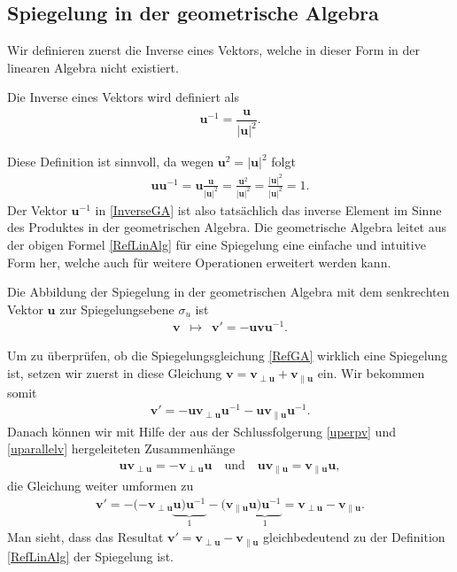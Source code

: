 \subsection{Spiegelung in der geometrische Algebra}
Wir definieren zuerst die Inverse eines Vektors, welche in dieser Form in der linearen Algebra nicht existiert.
%
\begin{definition}
	Die Inverse eines Vektors wird definiert als
	\begin{align} \label{InverseGA}
	\mathbf{u}^{-1} = \dfrac{\mathbf{u}}{|\mathbf{u}|^2}. 
	\end{align}
\end{definition}
Diese Definition ist sinnvoll, da wegen $\mathbf{u}^2 = |\mathbf{u}|^2$ folgt
\begin{align*}
\mathbf{uu}^{-1} = \mathbf{u} \frac{\mathbf{u}}{|\mathbf{u}|^2} = \frac{\mathbf{u}^2}{|\mathbf{u}|^2} = \frac{|\mathbf{u}|^2}{|\mathbf{u}|^2} = 1.
\end{align*}
Der Vektor $\mathbf{u}^{-1}$ in \eqref{InverseGA} ist also tatsächlich das inverse Element im Sinne des Produktes in der geometrischen Algebra.
Die geometrische Algebra leitet aus der obigen Formel \eqref{RefLinAlg} für eine Spiegelung eine einfache und intuitive Form her, welche auch für weitere Operationen erweitert werden kann.
\begin{definition}
	Die Abbildung der Spiegelung in der geometrischen Algebra mit dem senkrechten Vektor $\mathbf{u}$ zur Spiegelungsebene $\sigma_u$ ist 
	\begin{align}\label{RefGA}
	\mathbf{v} \enspace\mapsto\enspace \mathbf{v}' = -\mathbf{uvu}^{-1}.
	\end{align}
\end{definition}
Um zu überprüfen, ob die Spiegelungsgleichung \eqref{RefGA} wirklich eine Spiegelung ist, setzen wir zuerst in diese Gleichung $\mathbf{v} = \mathbf{v_{\perp u}} + \mathbf{v_{\parallel u}}$ ein. Wir bekommen somit
\begin{align*}
\mathbf{v}' = -\mathbf{uv_{\perp u}u}^{-1} - \mathbf{uv_{\parallel u}u}^{-1}.
\end{align*}
Danach können wir mit Hilfe der aus der Schlussfolgerung \eqref{uperpv} und \eqref{uparallelv} hergeleiteten Zusammenhänge
\begin{align*}
\mathbf{uv_{\perp u}} = -\mathbf{v_{\perp u}u} \quad\text{und}\quad \mathbf{uv_{\parallel u}}=\mathbf{v_{\parallel u}u},
\end{align*}
die Gleichung weiter umformen zu
\begin{align*}
\mathbf{v}' = -(-\mathbf{v_{\perp u}}\underbrace{\mathbf{u})\mathbf{u}^{-1}}_{1} -(\mathbf{v_{\parallel u}}\underbrace{\mathbf{u})\mathbf{u}^{-1}}_{1} = \mathbf{v_{\perp u}} - \mathbf{v_{\parallel u}}.
\end{align*}
Man sieht, dass das Resultat $\mathbf{v}' = \mathbf{v_{\perp u}} - \mathbf{v_{\parallel u}}$
gleichbedeutend zu der Definition \eqref{RefLinAlg} der Spiegelung ist.


